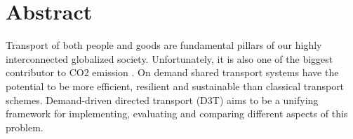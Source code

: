\section{Abstract}
Transport of both people and goods are fundamental pillars of our highly interconnected globalized society. Unfortunately, it is also one of the biggest contributor to CO2 emission \cite{ipcc2014}. On demand shared transport systems have the potential to be more efficient, resilient and sustainable than
classical transport schemes. Demand-driven directed transport (D3T) aims to be a unifying framework for implementing, evaluating and comparing different aspects of this problem. 
